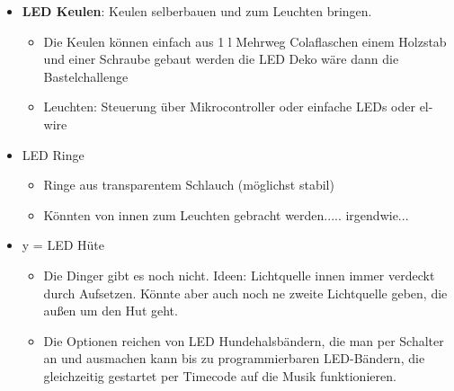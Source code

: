 \documentclass[a4]{article}
\begin{document}
\begin{itemize}
\item \textbf{LED Keulen}: Keulen selberbauen und zum Leuchten bringen.

\begin{itemize}
\item Die Keulen können einfach aus 1 l Mehrweg Colaflaschen einem Holzstab und einer Schraube gebaut werden die LED Deko wäre dann die Bastelchallenge
\item   Leuchten: Steuerung über Mikrocontroller oder einfache LEDs oder el-wire
\end{itemize}

\item    LED Ringe
\begin{itemize}
        \item    Ringe aus transparentem Schlauch (möglichst stabil)
        \item   Könnten von innen zum Leuchten gebracht werden..... irgendwie...
\end{itemize}

\item   y = LED Hüte

\begin{itemize}
        \item    Die Dinger gibt es noch nicht. Ideen: Lichtquelle innen immer verdeckt durch Aufsetzen. Könnte aber auch noch ne zweite Lichtquelle geben, die außen um den Hut geht.
        \item     Die Optionen reichen von LED Hundehalsbändern, die man  per Schalter an und ausmachen kann bis zu programmierbaren LED-Bändern, die gleichzeitig gestartet per Timecode auf die Musik funktionieren. 
\end{itemize}

\end{itemize} 
\end{document}
